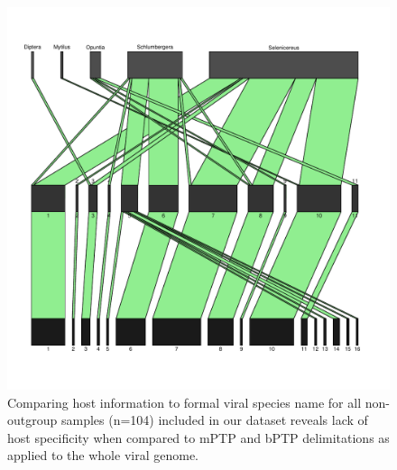 \documentclass[fleqn,10pt,lineno]{wlpeerj}
\begin{document}
\newpage{}
 \begin{figure}[ht]
 \centering
 \includegraphics[width=1\linewidth]{02_analyses/08_bipartite_figure/02_output/bipartite_web_jun25.pdf}
 \begin{NoHyper}
 \caption{
Comparing host information to formal viral species name for all non-outgroup samples (n=104) included in our dataset reveals lack of host specificity when compared to mPTP and bPTP delimitations as applied to the whole viral genome.
}
 \label{fig:fig2}
 \end{NoHyper}
 \end{figure}
\end{document}

